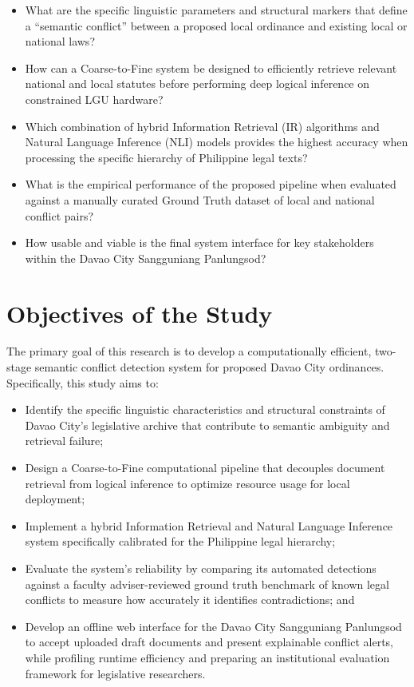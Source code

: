 \begin{itemize}
    \item What are the specific linguistic parameters and structural markers that define a ``semantic conflict'' between a proposed local ordinance and existing local or national laws?
    \item How can a Coarse-to-Fine system be designed to efficiently retrieve relevant national and local statutes before performing deep logical inference on constrained LGU hardware?
    \item Which combination of hybrid Information Retrieval (IR) algorithms and Natural Language Inference (NLI) models provides the highest accuracy when processing the specific hierarchy of Philippine legal texts?
    \item What is the empirical performance of the proposed pipeline when evaluated against a manually curated Ground Truth dataset of local and national conflict pairs?
    \item How usable and viable is the final system interface for key stakeholders within the Davao City Sangguniang Panlungsod?
\end{itemize}

\section{Objectives of the Study}
The primary goal of this research is to develop a computationally efficient, two-stage semantic conflict detection system for proposed Davao City ordinances. Specifically, this study aims to:
\begin{itemize}
    \item Identify the specific linguistic characteristics and structural constraints of Davao City's legislative archive that contribute to semantic ambiguity and retrieval failure;
    \item Design a Coarse-to-Fine computational pipeline that decouples document retrieval from logical inference to optimize resource usage for local deployment;
    \item Implement a hybrid Information Retrieval and Natural Language Inference system specifically calibrated for the Philippine legal hierarchy;
    \item Evaluate the system's reliability by comparing its automated detections against a faculty adviser-reviewed ground truth benchmark of known legal conflicts to measure how accurately it identifies contradictions; and
    \item Develop an offline web interface for the Davao City Sangguniang Panlungsod to accept uploaded draft documents and present explainable conflict alerts, while profiling runtime efficiency and preparing an institutional evaluation framework for legislative researchers.
\end{itemize}


